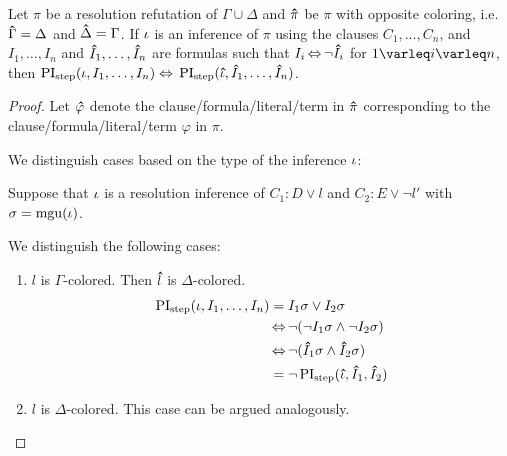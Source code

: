 \begin{lemma}
	\label{lemma:symmetry_step}
	Let $\pi$ be a resolution refutation of $\Gamma \cup \Delta$ and
	$\bm\hat{\pi}$ be $\pi$ with opposite coloring, i.e.\ $\bm\hat{\Gamma} = \Delta$ and $\bm\hat{\Delta} = \Gamma$.
	If $\iota$ is an inference of $\pi$ using the clauses $C_1, \dots, C_n$,
	and
	$I_1, \dots, I_n$ and 
	$\bm\hat{I}_1, \dots, \bm\hat{I}_n$ are formulas  
	such that $I_i \operatorname{\Leftrightarrow} \lnot \bm\hat{I}_i$ for $1\varleq i \varleq n$, then
	$\operatorname{PI}_{\mathrm{step}}(\iota, I_1, \dots, I_n) \;{\operatorname{\Leftrightarrow}}\; \operatorname{PI}_{\mathrm{step}}(\bm\hat{\iota}, \bm\hat{I}_1, \dots, \bm\hat{I}_n)$.
\end{lemma}
\begin{proof}
	Let $\bm\hat{\varphi}$ denote the clause/formula/literal/term in $\bm\hat{\pi}$ corresponding to the clause/formula/literal/term $\varphi$ in $\pi$.

	We distinguish cases based on the type of the inference $\iota$:

	\begin{indproof}
			\newcommand{\p}[1]{\primex{#1}}

			Suppose that $\iota$ is a resolution inference of $C_1: D \lor l$ and $C_2: E \lor \lnot l'$ with $\sigma = \operatorname{mgu}(\iota)$.

			We distinguish the following cases:
			\begin{enumerate}
				\item $l$ is $\Gamma$-colored. Then $\bm\hat{l}$ is $\Delta$-colored.
					\begin{align*}
						\PIstep(\inference, I_1, \dots, I_n) &= I_1\sigma \lor I_2\sigma\\
													 &\semiff \lnot ( \lnot I_1\sigma \land \lnot I_2\sigma )\\
														&\semiff \lnot ( \p I_1\sigma \land \p I_2\sigma ) \\
														&= \lnot \PIstep(\primex \inference, \p I_1, \p I_2)  
					\end{align*}
				\item $l$ is $\Delta$-colored. This case can be argued analogously.


\end{enumerate}
\end{indproof}
\end{proof}
